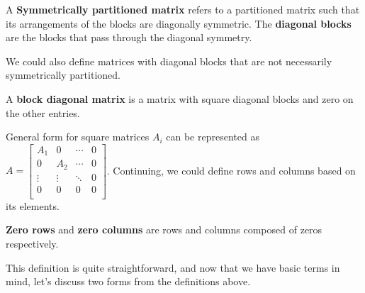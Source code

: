 \documentclass[../main.tex]{subfiles}
\begin{document}
\begin{definition}{}{}
A \textbf{Symmetrically partitioned matrix} refers to a partitioned
matrix such that its arrangements of the blocks are diagonally
symmetric. The \textbf{diagonal blocks} are the blocks that pass
through the diagonal symmetry.
\end{definition}

We could also define matrices with diagonal blocks that are not
necessarily symmetrically partitioned.

\begin{definition}{}{}
A \textbf{block diagonal matrix} is a matrix with square diagonal
blocks and zero on the other entries.
\end{definition}

General form for square matrices $A_i$ can be represented as $A =
\begin{bmatrix}
    A_1    & 0      & \cdots & 0 \\
    0      & A_2    & \cdots & 0 \\
    \vdots & \vdots & \ddots & 0 \\
    0      & 0      & 0      & 0 \\
\end{bmatrix}$.
Continuing, we could define rows and columns based on its elements.

\begin{definition}{}{}
\textbf{Zero rows} and \textbf{zero columns} are rows and columns
composed of zeros respectively.
\end{definition}

This definition is quite straightforward, and now that we have
basic terms in mind, let's discuss two forms from the definitions
above.
\end{document}
